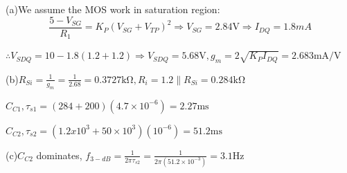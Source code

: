 \documentclass[a4paper,11pt,UTF8]{article}
\begin{document}
(a)We assume the MOS work in saturation region:
$$\frac{5-V_{SG}}{R_{1}}=K_{P}\left(V_{SG}+V_{TP}\right)^{2}\Rightarrow V_{SG}=2.84\mathrm{V}\Rightarrow I_{DQ}=1.8mA$$ 

$\therefore V_{SDQ}=10-1.8(1.2+1.2)\Rightarrow V_{SDQ}=5.68\mathrm{V} 
,g_{m}=2\sqrt{K_{P}I_{DQ}}=2.683\mathrm{mA/V}$ 

(b)$\displaystyle R_{Si}=\frac{1}{g_{m}}=\frac{1}{2.68}=0.3727\mathrm{k\Omega},R_{i}=1.2\parallel R_{Si}=0.284\mathrm{k\Omega}$

$C_{C1},\tau_{s1}=\left(284+200\right)\left(4.7\times10^{-6}\right)=2.27\mathrm{ms}$

$C_{C2},\tau_{s2}=\left(1.2x10^{3}+50\times10^{3}\right)\left(10^{-6}\right)=51.2\mathrm{ms}$  

(c)$C_{C2}$ dominates, $\displaystyle f_{3-dB}=\frac{1}{2\pi\tau_{s2}}=\frac{1}{2\pi\left(51.2\times10^{-3}\right)}=3.1\mathrm{Hz}$
\end{document}
